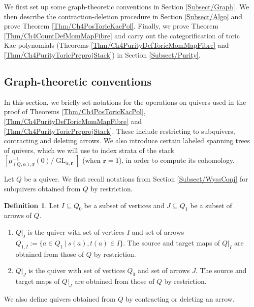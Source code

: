 \documentclass[11pt,english]{article}
\numberwithin{equation}{section}
\numberwithin{figure}{section}
\theoremstyle{definition}
\newtheorem{df}{Definition}[subsection]
\theoremstyle{plain}
\theoremstyle{remark}
\DeclareMathOperator{\GL}{GL}
\newcommand\rr{\mathbf{r}}
\begin{document}
We first set up some graph-theoretic conventions in Section \ref{Subsect/Graph}.
We then describe the contraction-deletion procedure in Section \ref{Subsect/Algo}
and prove Theorem \ref{Thm/Ch4PosToricKacPol}. Finally, we prove
Theorem \ref{Thm/Ch4CountDefMomMapFibre} and carry out the categorification
of toric Kac polynomials (Theorems \ref{Thm/Ch4PurityDefToricMomMapFibre}
and \ref{Thm/Ch4PurityToricPreprojStack}) in Section \ref{Subsect/Purity}.

\subsection{Graph-theoretic conventions \label{Subsect/Graph}}

In this section, we briefly set notations for the operations on quivers
used in the proof of Theorems \ref{Thm/Ch4PosToricKacPol}, \ref{Thm/Ch4PurityDefToricMomMapFibre}
and \ref{Thm/Ch4PurityToricPreprojStack}. These include restricting
to subquivers, contracting and deleting arrows. We also introduce
certain labeled spanning trees of quivers, which we will use to index
strata of the stack $\left[\mu_{(Q,\alpha),\rr}^{-1}(0)/\GL_{\alpha,\rr}\right]$
(when $\rr=\underline{1}$), in order to compute its cohomology.

Let $Q$ be a quiver. We first recall notations from Section \ref{Subsect/WyssConj}
for subquivers obtained from $Q$ by restriction.

\begin{df}

Let $I\subseteq Q_{0}$ be a subset of vertices and $J\subseteq Q_{1}$
be a subset of arrows of $Q$.
\begin{enumerate}
\item $Q\vert_{I}$ is the quiver with set of vertices $I$ and set of arrows
$Q_{1,I}:=\{a\in Q_{1}\ \vert\ s(a),t(a)\in I\}$. The source and
target maps of $Q\vert_{I}$ are obtained from those of $Q$ by restriction.
\item $Q\vert_{J}$ is the quiver with set of vertices $Q_{0}$ and set
of arrows $J$. The source and target maps of $Q\vert_{J}$ are obtained
from those of $Q$ by restriction.
\end{enumerate}
\end{df}

We also define quivers obtained from $Q$ by contracting or deleting
an arrow.
\end{document}

